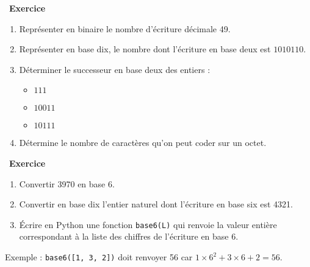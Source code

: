 \documentclass[
  11pt,
]{article}
\newcommand{\passthrough}[1]{#1}
\providecommand{\tightlist}{%
  \setlength{\itemsep}{0pt}\setlength{\parskip}{0pt}}
\newcounter{exo}
\newenvironment{exercice}[1]
{\par \medskip   \addtocounter{exo}{1} \noindent  
\begin{bclogo}[arrondi =0.1,   noborder = true, logo=\bccrayon, marge=4]{~\textbf{Exercice} \textbf{\theexo} {\itshape #1} }  \par}
{
\end{bclogo}
 \par \bigskip }
\newcounter{def}
\begin{document}
\begin{exercice}{}

\begin{enumerate}
\def\labelenumi{\arabic{enumi}.}
\tightlist
\item
  Représenter en binaire le nombre d'écriture décimale 49.
\item
  Représenter en base dix, le nombre dont l'écriture en base deux est
  \(1010110\).
\item
  Déterminer le successeur en base deux des entiers :

  \begin{itemize}
  \tightlist
  \item
    \(111\)
  \item
    \(10011\)
  \item
    \(10111\)
  \end{itemize}
\item
  Détermine le nombre de caractères qu'on peut coder sur un octet.
\end{enumerate}

\end{exercice}

\begin{exercice}{}

\begin{enumerate}
\def\labelenumi{\arabic{enumi}.}
\tightlist
\item
  Convertir 3970 en base 6.
\item
  Convertir en base dix l'entier naturel dont l'écriture en base six est
  4321.
\item
  Écrire en Python une fonction \passthrough{\lstinline!base6(L)!} qui
  renvoie la valeur entière correspondant à la liste des chiffres de
  l'écriture en base 6.
\end{enumerate}

Exemple : \passthrough{\lstinline!base6([1, 3, 2])!} doit renvoyer 56
car \(1 \times 6^{2} + 3 \times 6 + 2 = 56\).

\end{exercice}
\end{document}

